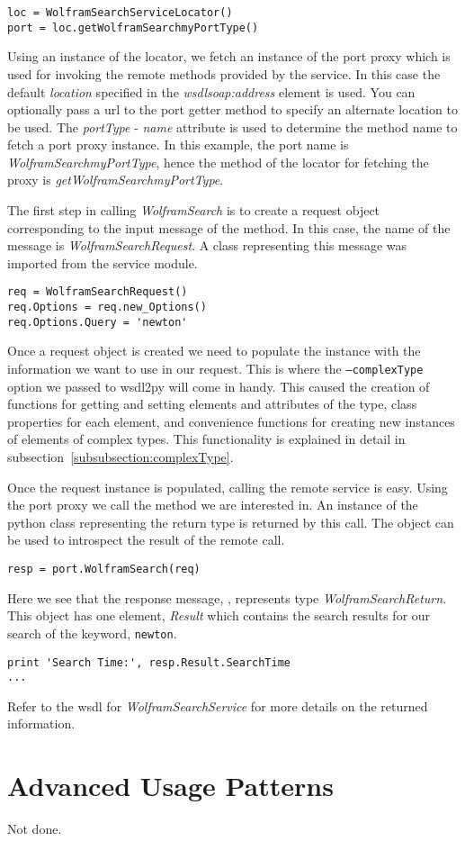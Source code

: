 \begin{verbatim}
loc = WolframSearchServiceLocator()
port = loc.getWolframSearchmyPortType()
\end{verbatim}

Using an instance of the locator, we fetch an instance of the port proxy
which is used for invoking the remote methods provided by the service.  In
this case the default {\it location} specified in the {\it wsdlsoap:address}
element is used.  You can optionally pass a url to the port getter method to
specify an alternate location to be used.  The {\it portType} - {\it name} 
attribute is used to determine the method name to fetch a port proxy instance.
In this example, the port name is {\it WolframSearchmyPortType}, hence the 
method of the locator for fetching the proxy is {\it getWolframSearchmyPortType}.

The first step in calling {\it WolframSearch} is to create a request object
corresponding to the input message of the method.  In this case, the name of
the message is {\it WolframSearchRequest}.  A class representing this message
was imported from the service module.

\begin{verbatim}
req = WolframSearchRequest()
req.Options = req.new_Options()
req.Options.Query = 'newton'
\end{verbatim}

Once a request object is created we need to populate the instance with the
information we want to use in our request.  This is where the {\tt --complexType}
option we passed to wsdl2py will come in handy.  This caused the creation of 
functions for getting and setting elements and attributes of the type, class 
properties for each element, and convenience functions for creating new instances
of elements of complex types.  This functionality is explained in detail in 
subsection~\ref{subsubsection:complexType}.

Once the request instance is populated, calling the remote service is easy.  Using
the port proxy we call the method we are interested in.  An instance of the python
class representing the return type is returned by this call.  The  object
can be used to introspect the result of the remote call.

\begin{verbatim}
resp = port.WolframSearch(req)
\end{verbatim}

Here we see that the response message, , represents type {\it WolframSearchReturn}.
This object has one element, {\it Result} which contains the search results for our
search of the keyword, {\tt newton}.

\begin{verbatim}
print 'Search Time:', resp.Result.SearchTime
...
\end{verbatim}

Refer to the wsdl for {\it WolframSearchService} for more details on the returned information.


\section{Advanced Usage Patterns}
\label{section:AUP}
Not done.


